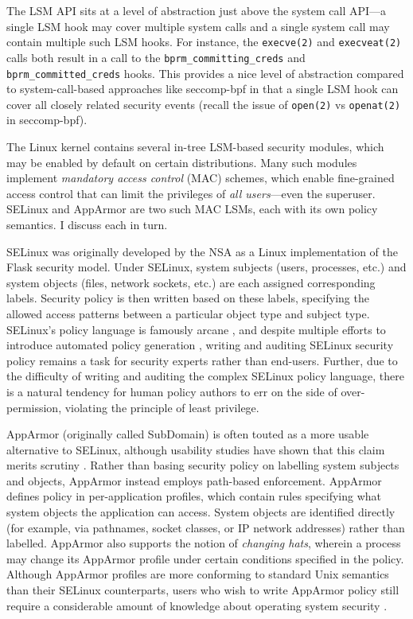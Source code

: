\documentclass[dvipsnames, 12pt]{article}
\begin{document}
The LSM API sits at a level of abstraction just above the system call API---a
single LSM hook may cover multiple system calls and a single system call may
contain multiple such LSM hooks. For instance, the \texttt{execve(2)} and
\texttt{execveat(2)} calls both result in a call to the
\texttt{bprm\_committing\_creds} and  \texttt{bprm\_committed\_creds} hooks.
This provides a nice level of abstraction compared to system-call-based
approaches like seccomp-bpf \cite{seccomp_bpf, drewry2012_seccomp_bpf} in that
a single LSM hook can cover all closely related security events (recall the
issue of \texttt{open(2)} vs \texttt{openat(2)} in seccomp-bpf).

The Linux kernel contains several in-tree LSM-based security modules, which may
be enabled by default on certain distributions.  Many such modules implement
\textit{mandatory access control} (MAC) schemes, which enable fine-grained
access control that can limit the privileges of \textit{all users}---even the
superuser. SELinux \cite{smalley2001_selinux} and AppArmor
\cite{cowan2000_apparmor} are two such MAC LSMs, each with its own policy
semantics. I discuss each in turn.

SELinux \cite{smalley2001_selinux} was originally developed by the NSA as
a Linux implementation of the Flask \cite{spencer1999_flask} security model.
Under SELinux, system subjects (users, processes, etc.) and system objects
(files, network sockets, etc.) are each assigned corresponding labels. Security
policy is then written based on these labels, specifying the allowed access
patterns between a particular object type and subject type. SELinux's policy
language is famously arcane \cite{schreuders12_towards}, and despite multiple
efforts to introduce automated policy generation \cite{audit2allow,
macmillan07_madison, sniffen06_guided}, writing and auditing SELinux security
policy remains a task for security experts rather than end-users. Further, due
to the difficulty of writing and auditing the complex SELinux policy language,
there is a natural tendency for human policy authors to err on the side of
over-permission, violating the principle of least privilege.

AppArmor (originally called SubDomain) \cite{cowan2000_apparmor} is often touted
as a more usable alternative to SELinux, although usability studies have shown
that this claim merits scrutiny \cite{schreuders12_towards}. Rather than basing
security policy on labelling system subjects and objects, AppArmor instead
employs path-based enforcement. AppArmor defines policy in per-application
profiles, which contain rules specifying what system objects the application can
access. System objects are identified directly (for example, via pathnames,
socket classes, or IP network addresses) rather than labelled.  AppArmor also
supports the notion of \textit{changing hats}, wherein a process may change its
AppArmor profile under certain conditions specified in the policy.  Although
AppArmor profiles are more conforming to standard Unix semantics than their
SELinux counterparts, users who wish to write AppArmor policy still require
a considerable amount of knowledge about operating system security
\cite{schreuders12_towards}.
\end{document}
